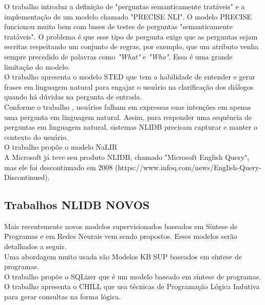 \documentclass{article}
\begin{document}
O trabalho \cite{popescu2003towards} introduz a definição de "perguntas semanticamente tratáveis" e a implementação de um modelo chamado "PRECISE NLI". O modelo PRECISE funcionou muito bem com bases de testes de perguntas "semanticamente tratáveis". O problema é que esse tipo de pergunta exige que as perguntas sejam escritas respeitando um conjunto de regras, por exemplo, que um atributo venha sempre precedido de palavras como \textit{"What"} e \textit{"Who"}. Essa é uma grande limitação do modelo. \\

O trabalho \citep{minock2005phrasal} apresenta o modelo STED que tem a habilidade de entender e gerar frases em linguagem natural para engajar o usuário na clarificação dos diálogos quando há dúvidas na pergunta de entrada. \\

Conforme o trabalho \citep{akula2013novel}, usuários falham em expressas suas intenções em apenas uma pergunta em linguagem natural. Assim, para responder uma sequência de perguntas em linguagem natural, sistemas NLIDB precisam capturar e manter o contexto do usuário. \\

O trabalho \citep{li2014constructing} propõe o modelo NaLIR \\

A Microsoft já teve seu produto NLIDB, chamado "Microsoft English Query", mas ele foi descontinuado em 2008 (https://www.infoq.com/news/English-Query-Discontinued).\\

\subsection{Trabalhos NLIDB NOVOS\label{novos}}

Mais recentemente novos modelos supervisionados baseados em Síntese de Programas e em Redes Neurais vem sendo propostos. Esses modelos serão detalhados a seguir.\\

Uma abordagem muito usada são Modelos KB SUP baseados em síntese de programas.\\

O trabalho \citep{yaghmazadeh2017sqlizer} propõe o SQLizer que é um modelo baseado em síntese de programas. \\

O trabalho \citep{zelle1996learning} apresenta o CHILL que usa técnicas de Programação Lógica Indutiva para gerar consultas na forma lógica.
\end{document}
